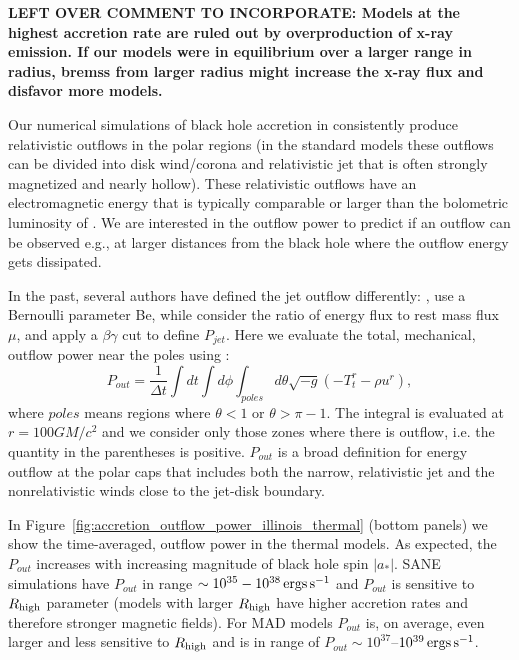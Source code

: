 \color{red}
{\bf LEFT OVER COMMENT TO INCORPORATE: Models at the highest accretion rate are ruled out by overproduction of x-ray emission.  If our models were in equilibrium over a larger range in radius, bremss from larger radius might increase the x-ray flux and disfavor more models.}
\color{black}

Our numerical simulations of black hole accretion in \sgra consistently produce relativistic outflows in the polar regions (in the standard models these outflows can be divided into disk wind/corona and relativistic jet that is often strongly magnetized and nearly hollow). These relativistic outflows have an electromagnetic energy that is typically comparable or larger than the bolometric luminosity of \sgra. We are interested in the outflow power to predict if an outflow can be observed e.g., at larger distances from the black hole where the outflow energy gets dissipated.

In the past, several authors have defined the jet outflow differently: \citet{refId0}, \citet{2014A&A...570A...7M} use a Bernoulli parameter Be, while \citealt{10.1111/j.1365-2966.2012.22002.x} consider the ratio of energy flux to rest mass flux $\mu$, and  apply a $\beta\gamma$ cut to define $P_{jet}$. Here we evaluate the total, mechanical, outflow power near the poles using :
\begin{equation}
    P_{out} = \frac{1}{\Delta t}\int dt \int d\phi  \int_{poles}d\theta \sqrt{-g}\left(-T^{r}_{t}-\rho u^{r}\right),
\end{equation}
where $poles$ means regions where $\theta<1$ or $\theta>\pi-1$. The integral is evaluated at $r=100GM/c^{2}$ and we consider only those zones where there is outflow, i.e. the quantity in the parentheses is positive. $P_{out}$ is a broad definition for energy outflow at the polar caps that includes both the narrow, relativistic jet and the nonrelativistic winds close to the jet-disk boundary.

In Figure~\ref{fig:accretion_outflow_power_illinois_thermal}
(bottom panels) we show
the time-averaged, outflow power in the \kharma thermal models. As expected, the $P_{out}$ increases with increasing magnitude of black hole spin $|a_{*}|$. SANE simulations have $P_{out}$ in range $\sim 10^{35}-10^{38} \,\mathrm{ergs\,s^{-1}}$ and $P_{out}$ is sensitive to $R_\mathrm{high}$ parameter (models with larger $R_\mathrm{high}$ have higher accretion rates and therefore stronger magnetic fields). For MAD models $P_{out}$ is, on average, even larger and less sensitive to $R_\mathrm{high}$ and is in range of $P_{out} \sim 10^{37}$--$10^{39} \,\mathrm{ergs\,s^{-1}}$.
\color{red}{\bf please add results from bhac for comparison if they are available.}\color{black}
\color{red}{\bf one should say a few words how electron distribution function changes mass accretion rate estimates and jet powers.}\color{black}

